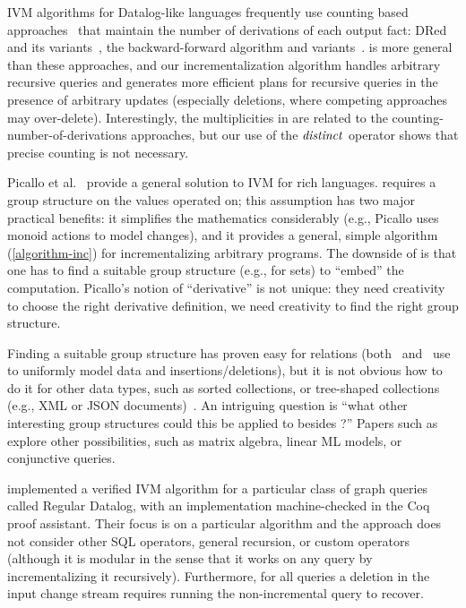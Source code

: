 IVM algorithms for Datalog-like languages frequently use counting based
approaches~\cite{Dewan-iis92,motik-aaai15} that maintain the number of derivations of each
output fact: DRed~\cite{gupta-sigmod93} and its variants~\cite{Ceri-VLDB91,Wolfson-sigmod91,%
Staudt-vldb96,Kotowski-rr11,Lu-sigmod95,Apt-sigmod87}, the backward-forward algorithm
and variants~\cite{motik-aaai15,Harrison-wdd92,motik-ai19}.
\dbsp is more general than these approaches,
and our incrementalization algorithm handles arbitrary recursive queries and
generates more efficient plans for recursive queries
in the presence of arbitrary updates (especially deletions, where competing approaches
may over-delete).  Interestingly, the \zrs multiplicities in \dbsp are related
to the counting-number-of-derivations approaches, but our use of the $\mathit{distinct}$
operator shows that precise counting is not necessary.

Picallo et al.~\cite{picallo-scop19} provide a general solution to IVM for
rich languages.  \dbsp requires a group structure on the values operated on;
this assumption has two major practical benefits: it simplifies the mathematics considerably
(e.g., Picallo uses monoid actions to model changes), and it provides a general, simple
algorithm (\ref{algorithm-inc}) for incrementalizing arbitrary programs.  The downside of
\dbsp is that one has to find a suitable group structure (e.g., \zrs for sets) to ``embed''
the computation.  Picallo's notion of ``derivative'' is not unique: they need creativity to choose
the right derivative definition, we need creativity to find the right group structure.

Finding a suitable group structure has proven easy for relations (both~\cite{koch-pods10}
and~\cite{green-tcs11} use \zrs to uniformly model data and insertions/deletions), but it is
not obvious how to do it for other data types, such as sorted collections, or tree-shaped
collections (e.g., XML or JSON documents)~\cite{foster-planx08}.  An intriguing question
is ``what other interesting group structures could this be applied to besides \zrs?''
Papers such as~\cite{nikolic-icmd18} explore other possibilities, such as matrix algebra,
linear ML models, or conjunctive queries.

\cite{bonifati-iclp2018} implemented a verified IVM algorithm for a particular
class of graph queries called Regular Datalog, with an implementation machine-checked in the
Coq proof assistant. Their focus is on a particular algorithm and the approach does not
consider other SQL operators, general recursion, or custom operators (although it is modular
in the sense that it works on any query by incrementalizing it recursively). Furthermore,
for all queries a deletion in the input change stream requires running the non-incremental
query to recover.

